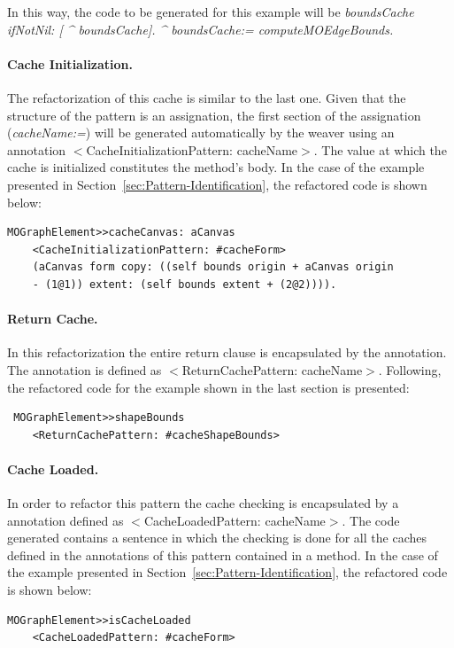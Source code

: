 \documentclass[preprint,10pt]{sigplanconf}
\newcommand{\secref}[1]{Section~\ref{sec:#1}\xspace}
\begin{document}
In this way, the code to be generated for this example will be \emph{boundsCache
ifNotNil: {[} \textasciicircum{} boundsCache{]}. \textasciicircum{}
boundsCache:= computeMOEdgeBounds.}

\paragraph{Cache Initialization.} The refactorization of this cache is
similar to the last one. Given that the structure of the pattern is
an assignation, the first section of the assignation (\emph{cacheName:=})
will be generated automatically by the weaver using an annotation $<$CacheInitializationPattern: cacheName$>$.
The value at which the cache is initialized constitutes the method's body.
In the case of the example presented in \secref{Pattern-Identification},
the refactored code is shown below:

\begin{lstlisting} 
MOGraphElement>>cacheCanvas: aCanvas 
	<CacheInitializationPattern: #cacheForm>  
	(aCanvas form copy: ((self bounds origin + aCanvas origin
	- (1@1)) extent: (self bounds extent + (2@2)))). 
\end{lstlisting}

\paragraph{Return Cache.} In this refactorization the entire return clause
is encapsulated by the annotation. The annotation is defined as $<$ReturnCachePattern:
cacheName$>$. Following, the refactored code for the example shown in
the last section is presented:

\begin{lstlisting}
 MOGraphElement>>shapeBounds 
	<ReturnCachePattern: #cacheShapeBounds> 
\end{lstlisting}

\paragraph{Cache Loaded.} In order to refactor this pattern the cache checking
is encapsulated by a annotation defined as $<$Cache\-Loaded\-Pattern:
cacheName$>$. The code generated contains a sentence in which the checking
is done for all the caches defined in the annotations of this pattern
contained in a method. In the case of the example presented in \secref{Pattern-Identification}, the refactored code is shown below:
\begin{lstlisting} 
MOGraphElement>>isCacheLoaded 
	<CacheLoadedPattern: #cacheForm>
\end{lstlisting}
\end{document}
